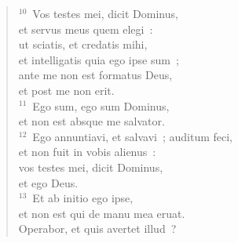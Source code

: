 \begin{flushleft}
\begin{verse}
${}^{10}$~Vos testes mei, dicit Dominus,\\ et servus meus quem elegi~:\\ ut sciatis, et credatis mihi,\\ et intelligatis quia ego ipse sum~;\\ ante me non est formatus Deus,\\ et post me non erit.\\
${}^{11}$~Ego sum, ego sum Dominus,\\ et non est absque me salvator.\\
${}^{12}$~Ego annuntiavi, et salvavi~; auditum feci,\\ et non fuit in vobis alienus~:\\ vos testes mei, dicit Dominus,\\ et ego Deus.\\
${}^{13}$~Et ab initio ego ipse,\\ et non est qui de manu mea eruat.\\ Operabor, et quis avertet illud~?\end{verse}\end{flushleft}


